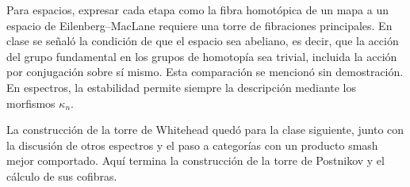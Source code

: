 \begin{nota}
Para espacios, expresar cada etapa como la fibra homotópica de un mapa a un espacio de Eilenberg--MacLane requiere una torre de fibraciones principales. En clase se señaló la condición de que el espacio sea abeliano, es decir, que la acción del grupo fundamental en los grupos de homotopía sea trivial, incluida la acción por conjugación sobre sí mismo. Esta comparación se mencionó sin demostración. En espectros, la estabilidad permite siempre la descripción mediante los morfismos $\kappa_n$.
\end{nota}

La construcción de la torre de Whitehead quedó para la clase siguiente, junto con la discusión de otros espectros y el paso a categorías con un producto smash mejor comportado. Aquí termina la construcción de la torre de Postnikov y el cálculo de sus cofibras.
